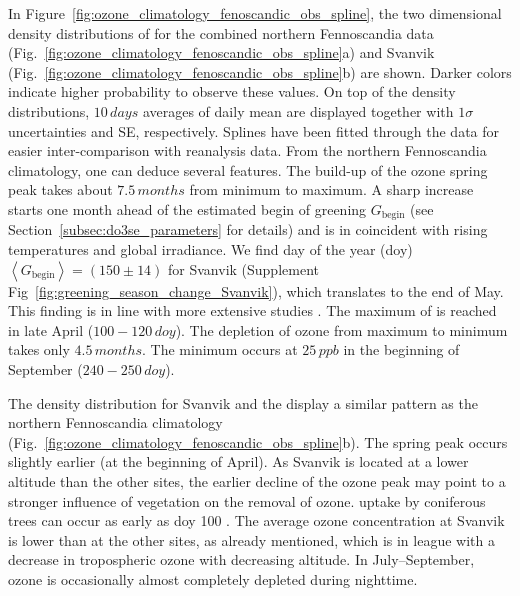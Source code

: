 \documentclass[bg, manuscript]{copernicus}
\begin{document}
In Figure~\ref{fig:ozone_climatology_fenoscandic_obs_spline}, the two dimensional density distributions of \chem{[O_3]} for the combined northern Fennoscandia data (Fig.~\ref{fig:ozone_climatology_fenoscandic_obs_spline}a) and Svanvik (Fig.~\ref{fig:ozone_climatology_fenoscandic_obs_spline}b) are shown. Darker colors indicate higher probability to observe these values. On top of the density distributions, $10\,\unit{days}$ averages of daily mean  are displayed together with $1 \sigma$ uncertainties and SE, respectively. Splines have been fitted through the data for easier inter-comparison with reanalysis data.
From the northern Fennoscandia climatology, one can deduce several features. The build-up of the ozone spring peak takes about $7.5\,\unit{months}$ from minimum to maximum. A sharp increase starts one month ahead of the estimated begin of greening $G_\mathrm{begin}$ (see Section~\ref{subsec:do3se_parameters} for details) and is in coincident with rising temperatures and global irradiance. We find day of the year (\unit{doy}) $\left<G_\mathrm{begin}\right> = (150 \pm 14)$ for Svanvik (Supplement Fig~\ref{fig:greening_season_change_Svanvik}), which translates to the end of May. This finding is in line with more extensive studies \citep[][e.g.,]{IJB:Karlsen2007,AFM:Linderholm2006}. The maximum of  is reached in late April ($100-120\,\unit{doy}$). The depletion of ozone from maximum to minimum takes only $4.5\,\unit{months}$. The minimum occurs at $25\,\unit{ppb}$ in the beginning of September ($240-250\,\unit{doy}$).

The density distribution for Svanvik and the  display a similar pattern as the northern Fennoscandia climatology (Fig.~\ref{fig:ozone_climatology_fenoscandic_obs_spline}b). The spring peak occurs slightly earlier (at the beginning of April). As Svanvik is located at a lower altitude than the other sites, the earlier decline of the ozone peak may point to a stronger influence of vegetation on the removal of ozone.  uptake by coniferous trees can occur as early as \unit{doy} 100 \citep{TB:Kolari2007, TP:Wallin2013}. The average ozone concentration at Svanvik is lower than at the other sites, as already mentioned, which is in league with a decrease in tropospheric ozone with decreasing altitude. In July--September, ozone is occasionally almost completely depleted during nighttime.
\end{document}
